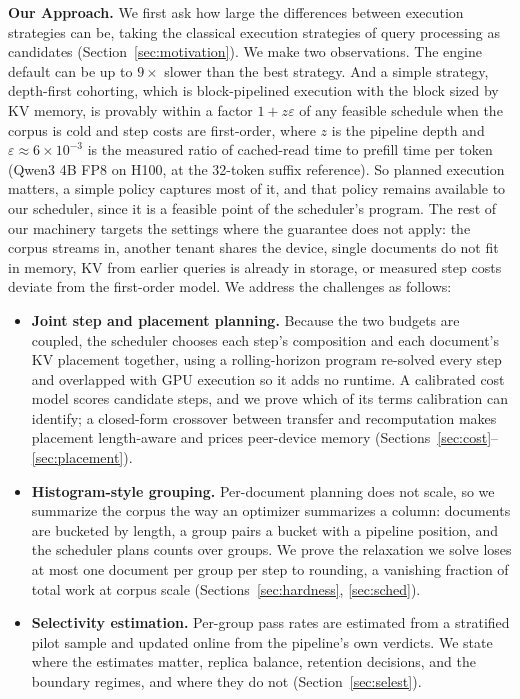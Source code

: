 \documentclass[10pt,twocolumn]{article}
\newcommand{\eps}{\varepsilon}
\begin{document}
\textbf{Our Approach.} We first ask how large the differences between execution strategies can be, taking the classical execution strategies of query processing as candidates (Section~\ref{sec:motivation}). We make two observations. The engine default can be up to $9\times$ slower than the best strategy. And a simple strategy, depth-first cohorting, which is block-pipelined execution with the block sized by KV memory, is provably within a factor $1 + z\eps$ of any feasible schedule when the corpus is cold and step costs are first-order, where $z$ is the pipeline depth and $\eps \approx 6 \times 10^{-3}$ is the measured ratio of cached-read time to prefill time per token (Qwen3 4B FP8 on H100, at the 32-token suffix reference). So planned execution matters, a simple policy captures most of it, and that policy remains available to our scheduler, since it is a feasible point of the scheduler's program. The rest of our machinery targets the settings where the guarantee does not apply: the corpus streams in, another tenant shares the device, single documents do not fit in memory, KV from earlier queries is already in storage, or measured step costs deviate from the first-order model. We address the challenges as follows:
\begin{itemize}[leftmargin=*,itemsep=1pt]
\item \textbf{Joint step and placement planning.} Because the two budgets are coupled, the scheduler chooses each step's composition and each document's KV placement together, using a rolling-horizon program re-solved every step and overlapped with GPU execution so it adds no runtime. A calibrated cost model scores candidate steps, and we prove which of its terms calibration can identify; a closed-form crossover between transfer and recomputation makes placement length-aware and prices peer-device memory (Sections~\ref{sec:cost}--\ref{sec:placement}).
\item \textbf{Histogram-style grouping.} Per-document planning does not scale, so we summarize the corpus the way an optimizer summarizes a column: documents are bucketed by length, a group pairs a bucket with a pipeline position, and the scheduler plans counts over groups. We prove the relaxation we solve loses at most one document per group per step to rounding, a vanishing fraction of total work at corpus scale (Sections~\ref{sec:hardness}, \ref{sec:sched}).
\item \textbf{Selectivity estimation.} Per-group pass rates are estimated from a stratified pilot sample and updated online from the pipeline's own verdicts. We state where the estimates matter, replica balance, retention decisions, and the boundary regimes, and where they do not (Section~\ref{sec:selest}).
\end{itemize}
\end{document}
